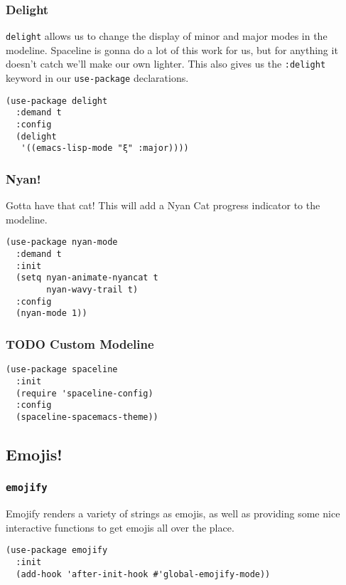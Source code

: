 \documentclass[11pt]{article}
\begin{document}
\subsubsection{Delight}
\label{sec:org1fd138d}
\texttt{delight} allows us to change the display of minor and major modes in
the modeline. Spaceline is gonna do a lot of this work for us, but for
anything it doesn't catch we'll make our own lighter. This also gives
us the \texttt{:delight} keyword in our \texttt{use-package} declarations.

\begin{verbatim}
(use-package delight
  :demand t
  :config
  (delight
   '((emacs-lisp-mode "ξ" :major))))
\end{verbatim}
\subsubsection{Nyan!}
\label{sec:orgcd563ff}
Gotta have that cat! This will add a Nyan Cat progress indicator to
the modeline.
\begin{verbatim}
(use-package nyan-mode
  :demand t
  :init
  (setq nyan-animate-nyancat t
        nyan-wavy-trail t)
  :config
  (nyan-mode 1))
\end{verbatim}
\subsubsection{{\bfseries\sffamily TODO} Custom Modeline}
\label{sec:org5bd5a61}
\begin{verbatim}
(use-package spaceline
  :init
  (require 'spaceline-config)
  :config
  (spaceline-spacemacs-theme))
\end{verbatim}
\subsection{Emojis!}
\label{sec:org7e45c4e}
\subsubsection{\texttt{emojify}}
\label{sec:orgbf5582d}
Emojify renders a variety of strings as emojis, as well as providing
some nice interactive functions to get emojis all over the place.

\begin{verbatim}
(use-package emojify
  :init
  (add-hook 'after-init-hook #'global-emojify-mode))
\end{verbatim}
\end{document}
